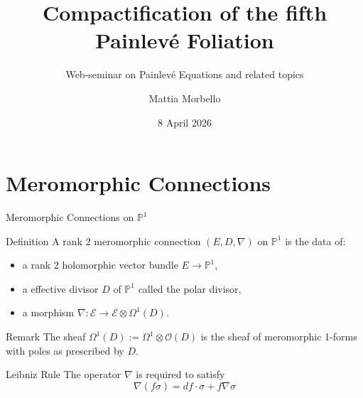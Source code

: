 \documentclass[10pt,xcolor=svgnames]{beamer} %
\title{Compactification of the fifth Painlevé Foliation}
\author[Name]{Mattia Morbello} %
\subtitle{Web-seminar on Painlevé Equations and related topics}
\institute[uni]{Université de Rennes}
\date{8 April 2026} %
\renewcommand{\P}{\mathbb{P}}
\renewcommand{\O}{\mathscr{O}}
\newcommand{\1}{\mathbbm{1}}
\begin{document}
{
\maketitle
}%







\section{Meromorphic Connections}


\begin{frame}{Meromorphic Connections on $\P^1$}
\begin{exampleblock}{Definition}
A rank 2 meromorphic connection $(E, D, \nabla)$ on $\P^1$ is the data of:
\begin{itemize}
	\item a rank 2 holomorphic vector bundle $E\to \P^1$,
	\item a effective divisor $D$ of $\P^1$ called the polar divisor,
	\item a morphism $\nabla\colon\mathcal E\to \mathcal E\otimes \Omega^1(D)$.
\end{itemize}
\end{exampleblock}
\begin{exampleblock}{Remark}
	The sheaf $\Omega^1(D):=\Omega^1\otimes \O(D)$ is the sheaf of meromorphic 1-forms with poles as prescribed by $D$.
\end{exampleblock}
\begin{exampleblock}{Leibniz Rule}
The operator $\nabla$ is required to satisfy
\[\nabla(f\sigma)=df\cdot\sigma+f\nabla\sigma\]
\end{exampleblock}
\end{frame}
\end{document}
